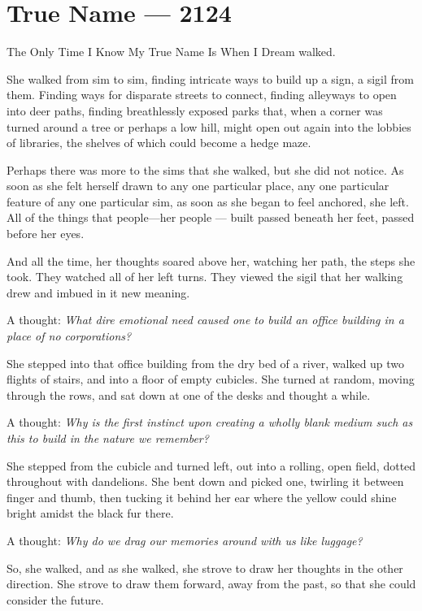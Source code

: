 \hypertarget{true-name-2124}{%
\chapter{True Name — 2124}\label{true-name-2124}}

The Only Time I Know My True Name Is When I Dream walked.

She walked from sim to sim, finding intricate ways to build up a sign, a sigil from them. Finding ways for disparate streets to connect, finding alleyways to open into deer paths, finding breathlessly exposed parks that, when a corner was turned around a tree or perhaps a low hill, might open out again into the lobbies of libraries, the shelves of which could become a hedge maze.

Perhaps there was more to the sims that she walked, but she did not notice. As soon as she felt herself drawn to any one particular place, any one particular feature of any one particular sim, as soon as she began to feel anchored, she left. All of the things that people---her people — built passed beneath her feet, passed before her eyes.

And all the time, her thoughts soared above her, watching her path, the steps she took. They watched all of her left turns. They viewed the sigil that her walking drew and imbued in it new meaning.

A thought: \emph{What dire emotional need caused one to build an office building in a place of no corporations?}

She stepped into that office building from the dry bed of a river, walked up two flights of stairs, and into a floor of empty cubicles. She turned at random, moving through the rows, and sat down at one of the desks and thought a while.

A thought: \emph{Why is the first instinct upon creating a wholly blank medium such as this to build in the nature we remember?}

She stepped from the cubicle and turned left, out into a rolling, open field, dotted throughout with dandelions. She bent down and picked one, twirling it between finger and thumb, then tucking it behind her ear where the yellow could shine bright amidst the black fur there.

A thought: \emph{Why do we drag our memories around with us like luggage?}

So, she walked, and as she walked, she strove to draw her thoughts in the other direction. She strove to draw them forward, away from the past, so that she could consider the future.

